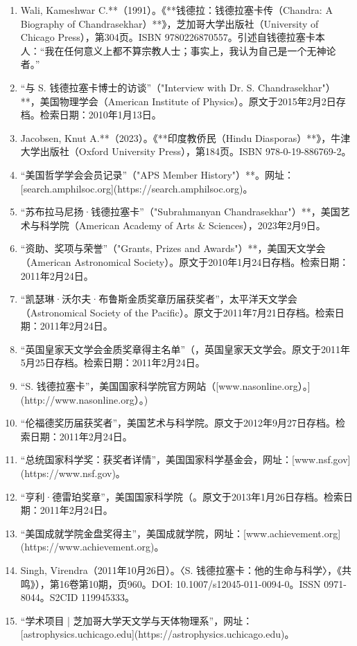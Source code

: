 \begin{enumerate}
\item Wali, Kameshwar C.**（1991）。《**钱德拉：钱德拉塞卡传（Chandra: A Biography of Chandrasekhar）**》，芝加哥大学出版社（University of Chicago Press），第304页。ISBN 9780226870557。引述自钱德拉塞卡本人：“我在任何意义上都不算宗教人士；事实上，我认为自己是一个无神论者。”
\item “与 S. 钱德拉塞卡博士的访谈”（"Interview with Dr. S. Chandrasekhar"）**，美国物理学会（American Institute of Physics）。原文于2015年2月2日存档。检索日期：2010年1月13日。
\item Jacobsen, Knut A.**（2023）。《**印度教侨民（Hindu Diasporas）**》，牛津大学出版社（Oxford University Press），第184页。ISBN 978-0-19-886769-2。
\item “美国哲学学会会员记录”（"APS Member History"）**。网址：[search.amphilsoc.org](https://search.amphilsoc.org)。
\item “苏布拉马尼扬·钱德拉塞卡”（"Subrahmanyan Chandrasekhar"）**，美国艺术与科学院（American Academy of Arts & Sciences），2023年2月9日。
\item “资助、奖项与荣誉”（"Grants, Prizes and Awards"）**，美国天文学会（American Astronomical Society）。原文于2010年1月24日存档。检索日期：2011年2月24日。
\item “凯瑟琳·沃尔夫·布鲁斯金质奖章历届获奖者”，太平洋天文学会（Astronomical Society of the Pacific）。原文于2011年7月21日存档。检索日期：2011年2月24日。
\item “英国皇家天文学会金质奖章得主名单”（，英国皇家天文学会。原文于2011年5月25日存档。检索日期：2011年2月24日。
\item “S. 钱德拉塞卡”，美国国家科学院官方网站（[www.nasonline.org）。](http://www.nasonline.org）。)
\item “伦福德奖历届获奖者”，美国艺术与科学院。原文于2012年9月27日存档。检索日期：2011年2月24日。
\item “总统国家科学奖：获奖者详情”，美国国家科学基金会，网址：[www.nsf.gov](https://www.nsf.gov)。
\item “亨利·德雷珀奖章”，美国国家科学院（。原文于2013年1月26日存档。检索日期：2011年2月24日。
\item “美国成就学院金盘奖得主”，美国成就学院，网址：[www.achievement.org](https://www.achievement.org)。
\item Singh, Virendra（2011年10月26日）。〈S. 钱德拉塞卡：他的生命与科学〉，《共鸣》），第16卷第10期，页960。DOI: 10.1007/s12045-011-0094-0。ISSN 0971-8044。S2CID 119945333。
\item “学术项目 | 芝加哥大学天文学与天体物理系”，网址：[astrophysics.uchicago.edu](https://astrophysics.uchicago.edu)。

\end{enumerate}
